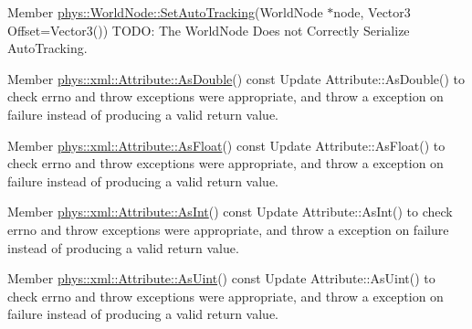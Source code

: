 \label{todo__todo000035}
\hypertarget{todo__todo000035}{}
 
\begin{DoxyDescription}
\item[Member \hyperlink{classphys_1_1WorldNode_a3c8447cd6de0af06a6004cdd968671f0}{phys::WorldNode::SetAutoTracking}(WorldNode $\ast$node, Vector3 Offset=Vector3()) ]TODO: The WorldNode Does not Correctly Serialize AutoTracking. 
\end{DoxyDescription}

\label{todo__todo000046}
\hypertarget{todo__todo000046}{}
 
\begin{DoxyDescription}
\item[Member \hyperlink{classphys_1_1xml_1_1Attribute_a467ae167d5407ae3293a22b8873cb43a}{phys::xml::Attribute::AsDouble}() const  ]Update Attribute::AsDouble() to check errno and throw exceptions were appropriate, and throw a exception on failure instead of producing a valid return value. 
\end{DoxyDescription}

\label{todo__todo000047}
\hypertarget{todo__todo000047}{}
 
\begin{DoxyDescription}
\item[Member \hyperlink{classphys_1_1xml_1_1Attribute_aad74f805b9318735011d698ee39113aa}{phys::xml::Attribute::AsFloat}() const  ]Update Attribute::AsFloat() to check errno and throw exceptions were appropriate, and throw a exception on failure instead of producing a valid return value. 
\end{DoxyDescription}

\label{todo__todo000044}
\hypertarget{todo__todo000044}{}
 
\begin{DoxyDescription}
\item[Member \hyperlink{classphys_1_1xml_1_1Attribute_ada1f2e45ce636ad8482972263364e7fa}{phys::xml::Attribute::AsInt}() const  ]Update Attribute::AsInt() to check errno and throw exceptions were appropriate, and throw a exception on failure instead of producing a valid return value. 
\end{DoxyDescription}

\label{todo__todo000045}
\hypertarget{todo__todo000045}{}
 
\begin{DoxyDescription}
\item[Member \hyperlink{classphys_1_1xml_1_1Attribute_ad00ec5857fc4afcda892a0057419a9a0}{phys::xml::Attribute::AsUint}() const  ]Update Attribute::AsUint() to check errno and throw exceptions were appropriate, and throw a exception on failure instead of producing a valid return value. 
\end{DoxyDescription}

